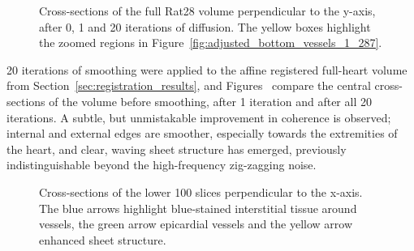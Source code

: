 \begin{figure}[htbp]
      \caption{Cross-sections of the full Rat28 volume perpendicular to the y-axis, after 0, 1 and 20 iterations of diffusion. The yellow boxes highlight the zoomed regions in Figure~\ref{fig:adjusted_bottom_vessels_1_287}.}
      \label{fig:adjusted_1_287}
    \end{figure}
    
    20 iterations of smoothing were applied to the affine registered full-heart volume from Section~\ref{sec:registration_results}, and Figures~ compare the central cross-sections of the volume before smoothing, after 1 iteration and after all 20 iterations. A subtle, but unmistakable improvement in coherence is observed; internal and external edges are smoother, especially towards the extremities of the heart, and clear, waving sheet structure has emerged, previously indistinguishable beyond the high-frequency zig-zagging noise.
    
    \begin{figure}
      \centering
      \caption{Cross-sections of the lower 100 slices perpendicular to the x-axis. The blue arrows highlight blue-stained interstitial tissue around vessels, the green arrow epicardial vessels and the yellow arrow enhanced sheet structure.}
      \label{fig:adjusted_bottom_vessels_0_235}
    \end{figure}


